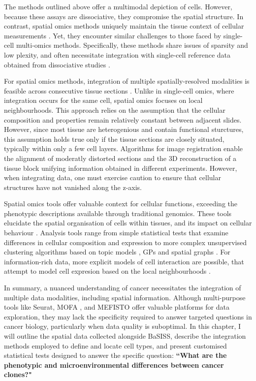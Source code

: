 The methods outlined above offer a multimodal depiction of cells. However, because these assays are dissociative, they compromise the spatial structure. In contrast, spatial omics methods uniquely maintain the tissue context of cellular measurements . Yet, they encounter similar challenges to those faced by single-cell multi-omics methods. Specifically, these methods share issues of sparsity and low plexity, and often necessitate integration with single-cell reference data obtained from dissociative studies . 

For spatial omics methods, integration of multiple spatially-resolved modalities is feasible across consecutive tissue sections . Unlike in single-cell omics, where integration occurs for the same cell, spatial omics focuses on local neighbourhoods. This approach relies on the assumption that the cellular composition and properties remain relatively constant between adjacent slides. However, since most tissue are heterogenious and contain functional sturctures, this assumption holds true only if the tissue sections are closely situated, typically within only a few cell layers. Algorithms for image registration enable the alignment of moderatly distorted sections and the 3D reconstruction of a tissue block \parencite{Kiemen2020-dc} unifying information obtained in different experiments. However, when integrating data, one must exercise caution to ensure that cellular structures have not vanished along the z-axis.

Spatial omics tools offer valuable context for cellular functions, exceeding the phenotypic descriptions available through traditional genomics. These tools elucidate the spatial organisation of cells within tissues, and its impact on cellular behaviour . Analysis tools range from simple statistical tests that examine differences in cellular composition and expression to more complex unsupervised clustering algorithms based on topic models \parencite{Nirmal2022-sq}, \aclp{GP} \parencite{Svensson2018-eu} and spatial graphs \parencite{Danenberg2022-zb}. For information-rich data, more explicit models of cell interaction are possible, that attempt to model cell expresion based on the local neighbourhoods \parencite{Fischer2023-go}.

In summary, a nuanced understanding of cancer necessitates the integration of multiple data modalities, including spatial information. Although multi-purpose tools like Seurat, MOFA \parencite{Argelaguet2018-oz}, and MEFISTO \parencite{Velten2022-gc} offer valuable platforms for data exploration, they may lack the specificity required to answer targeted questions in cancer biology, particularly when data quality is suboptimal. In this chapter, I will outline the spatial data collected alongside \ac{BaSISS}, describe the integration methods employed to define and locate cell types, and present customised statistical tests designed to answer the specific question: \textbf{``What are the phenotypic and microenvironmental differences between cancer clones?"}

